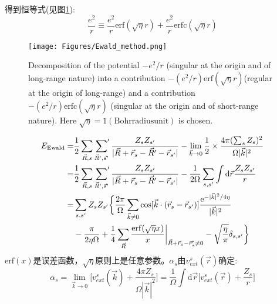 \documentclass{article}      %
\newcommand{\upcite}[1]{\hspace{0ex}\textsuperscript{\cite{#1}}} %
\begin{document}
得到恒等式(见图\ref{Error_Function}):
\begin{equation}
	\dfrac{e^2}r\equiv\dfrac{e^2}r\mathrm{erf}(\sqrt{\eta}r)+\dfrac{e^2}r\mathrm{erfc}(\sqrt{\eta}r)
	\label{eq:err_fun_comp}
\end{equation}
\begin{figure}[h!]
\centering
\vspace*{-0.10in}
\texttt{[image: Figures/Ewald\_method.png]}
\caption{\small \textrm{Decomposition of the potential $-e^2/r$ (singular at the origin and of long-range nature) into a contribution $-(e^2/r)\mathrm{erf}(\sqrt{\eta}r)$(regular at the origin of long-range) and a contribution $-(e^2/r)\mathrm{erfc}(\sqrt{\eta}r)$ (singular at the origin and of short-range nature). Here $\sqrt{\eta}=1 (\mathrm{Bohr radius unit})$ is chosen.}\upcite{Grosso-Parravicini}}%
\label{Error_Function}
\end{figure}

	\begin{equation}
		\begin{aligned}
			E_{\textrm{Ewald}}=&\dfrac12\sum_{\vec R,s}\sideset{}{^{\prime}}\sum_{\vec R^{\prime},\vec s^{\prime}}\dfrac{Z_sZ_{s^{\prime}}}{|\vec R+\vec r_s-\vec R^{\prime}-\vec r_{s^{\prime}}|}-\lim_{\vec k\rightarrow0}\dfrac12\times\dfrac{4\pi(\sum_sZ_s)^2}{\Omega|\vec k|^2}\\
			=&\dfrac12\sum_{\vec R,s}\sideset{}{^{\prime}}\sum_{\vec R^{\prime},\vec s^{\prime}}\dfrac{Z_sZ_{s^{\prime}}}{|\vec R+\vec r_s-\vec R^{\prime}-\vec r_{s^{\prime}}|}-\dfrac1{2\Omega}\sum_{s,s^{\prime}}\int\mathrm{d}\vec r\dfrac{Z_sZ_{s^{\prime}}}r\\
			=&\sum_{s,s^{\prime}}Z_sZ_{s^{\prime}}\bigg\{\dfrac{2\pi}{\Omega}\sum_{\vec k\neq 0}\cos[\vec k\cdot(\vec r_s-\vec r_{s^{\prime}})]\dfrac{\mathrm{e}^{-|\vec k|^2/4\eta}}{|\vec k|^2}\\
			&-\dfrac{\pi}{2\eta\Omega}+\dfrac14\sum_{\vec R}\dfrac{\mathrm{erf}(\sqrt{\eta}x)}x\bigg|_{\vec R+\vec r_s-\vec r_s^{\prime}\neq0}-\sqrt{\dfrac{\eta}{\pi}}\delta_{s,s^{\prime}}\bigg\}
		\end{aligned}
		\label{eq:Ewald_ENE}
	\end{equation}
	$\mathrm{erf}(x)$是误差函数，$\sqrt{\eta}$原则上是任意参数。$\alpha_s$由$v_{ext}^s(\vec r)$确定:~
	\begin{equation}
		\alpha_s=\lim_{\vec k\rightarrow0}\bigg[v_{ext}^s(\vec k)+\dfrac{4\pi Z_s}{\Omega|\vec k|^2}\bigg]=\dfrac1{\Omega}\int\mathrm{d}\vec r\bigg[v_{ext}^s(\vec r)+\dfrac{Z_s}r\bigg]
		\label{eq:alpha_s}
	\end{equation}
\end{document}
